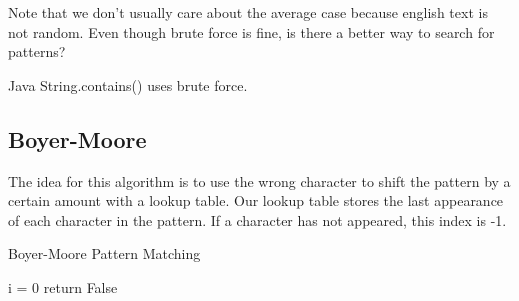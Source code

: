 Note that we don't usually care about the average case because english text is not random. Even though brute force is fine, is there a better way to search for patterns?

\begin{note}
	Java String.contains() uses brute force.
\end{note}

\subsection{Boyer-Moore}

The idea for this algorithm is to use the wrong character to shift the pattern by a certain amount with a lookup table. Our lookup table stores the last appearance of each character in the pattern. If a character has not appeared, this index is -1.

\begin{algorithm}[H]
	\caption{Boyer-Moore Pattern Matching}
	i = 0\;
	return False\;
\end{algorithm}
